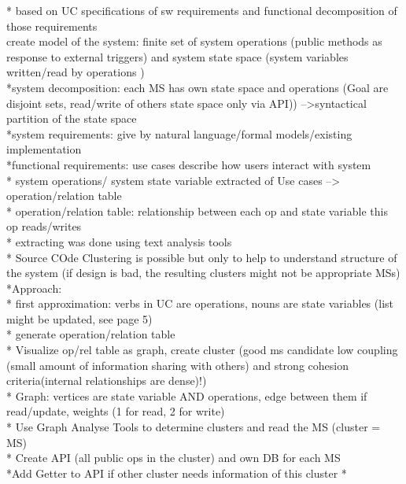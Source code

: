 * based on UC specifications of sw requirements and functional decomposition of those requirements \\
create model of the system: finite set of system operations (public methods as response to external triggers) and system state space (system variables written/read by operations )\\
*system decomposition: each MS has own state space and operations (Goal are disjoint sets, read/write of others state space only via API)) -->syntactical partition of the state space \\
*system requirements: give by natural language/formal models/existing implementation \\
*functional requirements: use cases describe how users interact with system \\
* system operations/ system state variable extracted of Use cases --> operation/relation table\\
* operation/relation table: relationship between each op and state variable this op reads/writes\\
* extracting was done using text analysis tools\\
* Source COde Clustering is possible but only to help to understand structure of the system (if design is bad, the resulting clusters might not be appropriate MSs)\\

*Approach: \\
* first approximation:  verbs in UC are operations, nouns are state variables (list might be updated, see page 5)\\
* generate operation/relation table\\
* Visualize op/rel table as graph, create cluster (good ms candidate low coupling (small amount of information sharing with others) and strong cohesion criteria(internal relationships are dense)!)\\
* Graph: vertices are state variable AND operations, edge between them if read/update, weights (1 for read, 2 for write)\\
* Use Graph Analyse Tools to determine clusters and read the MS (cluster = MS)\\
* Create API (all public ops in the cluster) and own DB for each MS\\
*Add Getter to API if other cluster needs information of this cluster
* 


